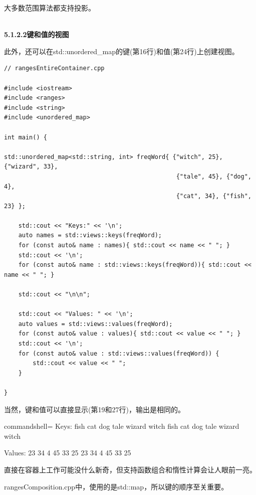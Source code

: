 大多数范围算法都支持投影。

\hspace*{\fill} \\ %
\noindent
\textbf{5.1.2.2\hspace{0.2cm}键和值的视图}

此外，还可以在std::unordered\_map的键(第16行)和值(第24行)上创建视图。

\begin{lstlisting}[style=styleCXX]
// rangesEntireContainer.cpp

#include <iostream>
#include <ranges>
#include <string>
#include <unordered_map>

int main() {

std::unordered_map<std::string, int> freqWord{ {"witch", 25}, {"wizard", 33},
												{"tale", 45}, {"dog", 4},
												{"cat", 34}, {"fish", 23} };

	std::cout << "Keys:" << '\n';
	auto names = std::views::keys(freqWord);
	for (const auto& name : names){ std::cout << name << " "; }
	std::cout << '\n';
	for (const auto& name : std::views::keys(freqWord)){ std::cout << name << " "; }
	
	std::cout << "\n\n";

	std::cout << "Values: " << '\n';
	auto values = std::views::values(freqWord);
	for (const auto& value : values){ std::cout << value << " "; }
	std::cout << '\n';
	for (const auto& value : std::views::values(freqWord)) {
		std::cout << value << " ";
	}

}
\end{lstlisting}

当然，键和值可以直接显示(第19和27行)，输出是相同的。

\begin{tcblisting}{commandshell={}}
Keys:
fish cat dog tale wizard witch
fish cat dog tale wizard witch

Values:
23 34 4 45 33 25
23 34 4 45 33 25
\end{tcblisting}

直接在容器上工作可能没什么新奇，但支持函数组合和惰性计算会让人眼前一亮。


rangesComposition.cpp中，使用的是std::map，所以键的顺序至关重要。

